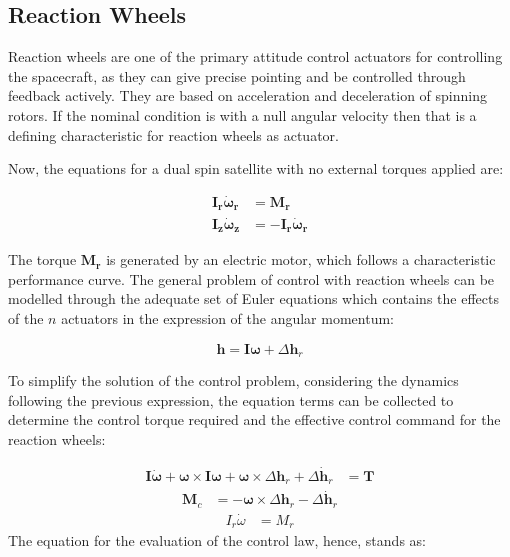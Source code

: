 \subsection{Reaction Wheels}
\label{subsec:reaction_wheels}

Reaction wheels are one of the primary attitude control actuators for controlling the spacecraft, as they can give precise pointing and be controlled through feedback actively. They are based on acceleration and deceleration of spinning rotors. If the nominal condition is with a null angular velocity then that is a defining characteristic for reaction wheels as actuator.

Now, the equations for a dual spin satellite with no external torques applied are:

\begin{equation}
	\begin{aligned}
		\boldsymbol{I_{r} \dot{\omega}_{r}} &= \boldsymbol{M_{r}} \\
	    \boldsymbol{I_{z} \dot{\omega}_{z}} &= -\boldsymbol{I_{r}\dot{\omega}_{r}}
    \end{aligned}
\end{equation}

The torque $\boldsymbol{M_{r}}$ is generated by an electric motor, which follows a characteristic performance curve. The general problem of control with reaction wheels can be modelled through the adequate set of Euler equations which contains the effects of the $n$ actuators in the expression of the angular momentum:

\begin{equation}
	\boldsymbol{h} = \boldsymbol{I} \boldsymbol{\omega} + \Delta \mathbf{h}_r
\end{equation}

To simplify the solution of the control problem, considering the dynamics following the previous expression, the equation terms can be collected to determine the control torque required and the effective control command for the reaction wheels:

	\begin{align*}
	\boldsymbol{I} \dot{\boldsymbol{\omega}} + \boldsymbol{\omega} \times \boldsymbol{I} \boldsymbol{\omega} + \boldsymbol{\omega} \times \Delta \mathbf{h}_r + \Delta \dot{\mathbf{h}}_r &= \mathbf{T} 
	\end{align*}
	\begin{align*}
		\mathbf{M}_c &= -\boldsymbol{\omega} \times \Delta \mathbf{h}_r - \Delta \dot{\mathbf{h}}_r
	\end{align*}
	\begin{align*}
			I_r \dot{{\omega}} &= {M}_r 
	\end{align*}
The equation for the evaluation of the control law, hence, stands as:
	
